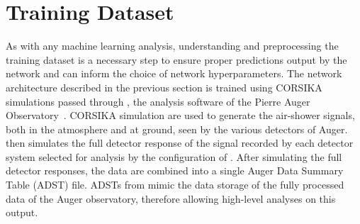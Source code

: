








\section{Training Dataset}\label{sec:data}
As with any machine learning analysis, understanding and preprocessing the training dataset is a necessary step to ensure proper predictions output by the network and can inform the choice of network hyperparameters.
The network architecture described in the previous section is trained using CORSIKA simulations passed through \Offline, the analysis software of the Pierre Auger Observatory~\cite{offline_nima2007, auger_nima2011_radiooffline}.
CORSIKA simulation are used to generate the air-shower signals, both in the atmosphere and at ground, seen by the various detectors of Auger.
\Offline then simulates the full detector response of the signal recorded by each detector system selected for analysis by the configuration of \Offline.
After simulating the full detector responses, the data are combined into a single Auger Data Summary Table (ADST) file.
ADSTs from \Offline mimic the data storage of the fully processed data of the Auger observatory, therefore allowing high-level analyses on this output.

